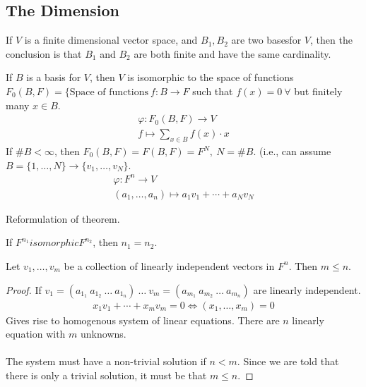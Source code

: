 \documentclass[class=scrartcl, crop=false]{standalone}
\begin{document}
\subsection{The Dimension}

\begin{theorem}
  If $V$ is a finite dimensional vector space, and $B_1, B_2$ are two basesfor $V$, then the conclusion is that $B_1$ and $B_2$ are both finite and have the same cardinality.
\end{theorem} 

\begin{recall}
  If $B$ is a basis for $V$, then $V$ is isomorphic to the space of functions $F_0(B, F) = \{\text{Space of functions} \ f:B \to F$ such that $f(x) = 0 \ \forall$ but finitely many $x \in B$.
    \begin{gather*}
      \varphi: F_0(B, F) \to V \\
      f \mapsto \sum_{x \in B}f(x) \cdot x
    \end{gather*} 
    If $\# B < \infty$, then $F_0(B, F) = F(B, F) = F^N, \ N = \#B$. (i.e., can assume $B = \{1, \dots, N\} \to \{v_1, \dots, v_N\}$.
    \begin{gather*}
      \varphi: F^n \to V \\
      (a_1, \dots, a_n) \mapsto a_1v_1 + \cdots + a_Nv_N
    \end{gather*} 
\end{recall} 

Reformulation of theorem.

If $F^{n_1} isomorphic F^{n_2}$, then $n_1 = n_2$.

\begin{lemma}
  Let $v_1, \dots, v_m$ be a collection of linearly independent vectors in $F^n$. Then $m \leq n$.
  \begin{proof}
    If $v_1 = (a_{1_1} \ a_{1_2} \ \dots \ a_{1_n}) \ \dots \ v_m = (a_{m_1} \ a_{m_2} \ \dots \ a_{m_n})$ are linearly independent.
    \begin{gather*}
      x_1v_1 + \cdots + x_mv_m = 0 \Leftrightarrow (x_1, \dots, x_m) = 0
    \end{gather*} 
    Gives rise to homogenous system of linear equations. There are $n$ linearly equation with $m$ unknowns. %
    \\\\
    The system must have a non-trivial solution if $n < m$. Since we are told that there is only a trivial solution, it must be that $m \leq n$.
  \end{proof} 
\end{lemma} 
\end{document}
